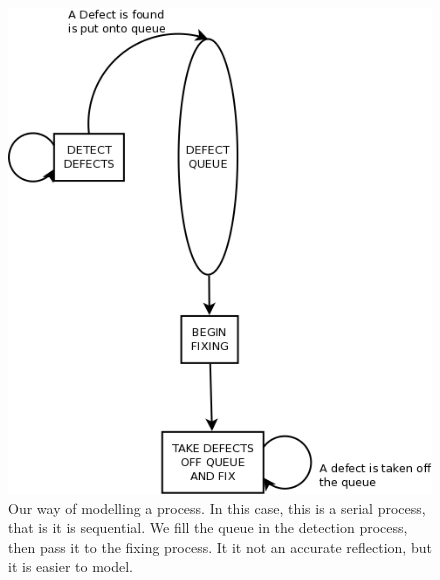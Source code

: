 \begin{figure}[ht!]
  \centering
	\includegraphics[scale=0.5]{Derp.png}
	\caption{ Our way of modelling a process. In this case, this is a serial
    process, that is it is sequential. We fill the queue in the detection
      process, then pass it to the fixing process. It it not an accurate reflection, but it
  is easier to model.} \label{fakeDefectProcess}
\end{figure}

